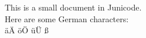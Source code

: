 \documentclass{article}
\begin{document}
This is a small document in Junicode.
\\
Here are some German characters:
\\
äÄ öÖ üÜ ß
\end{document}
